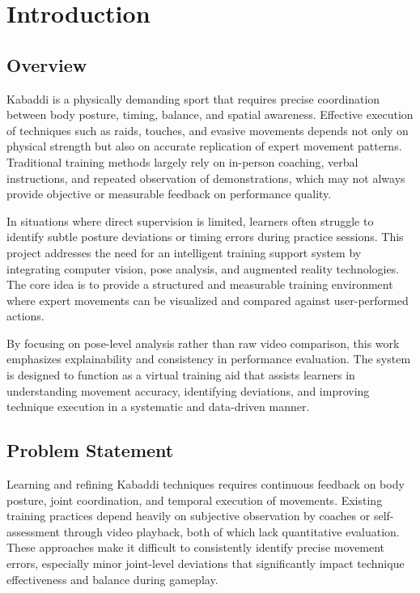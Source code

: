 \documentclass[12pt, a4paper]{report}
\begin{document}
\newpage
{}
\chapter{Introduction}

\section{Overview}
Kabaddi is a physically demanding sport that requires precise coordination between body posture, timing, balance, and spatial awareness. Effective execution of techniques such as raids, touches, and evasive movements depends not only on physical strength but also on accurate replication of expert movement patterns. Traditional training methods largely rely on in-person coaching, verbal instructions, and repeated observation of demonstrations, which may not always provide objective or measurable feedback on performance quality.

In situations where direct supervision is limited, learners often struggle to identify subtle posture deviations or timing errors during practice sessions. This project addresses the need for an intelligent training support system by integrating computer vision, pose analysis, and augmented reality technologies. The core idea is to provide a structured and measurable training environment where expert movements can be visualized and compared against user-performed actions. 

By focusing on pose-level analysis rather than raw video comparison, this work emphasizes explainability and consistency in performance evaluation. The system is designed to function as a virtual training aid that assists learners in understanding movement accuracy, identifying deviations, and improving technique execution in a systematic and data-driven manner.

\section{Problem Statement}
Learning and refining Kabaddi techniques requires continuous feedback on body posture, joint coordination, and temporal execution of movements. Existing training practices depend heavily on subjective observation by coaches or self-assessment through video playback, both of which lack quantitative evaluation. These approaches make it difficult to consistently identify precise movement errors, especially minor joint-level deviations that significantly impact technique effectiveness and balance during gameplay.
\end{document}
